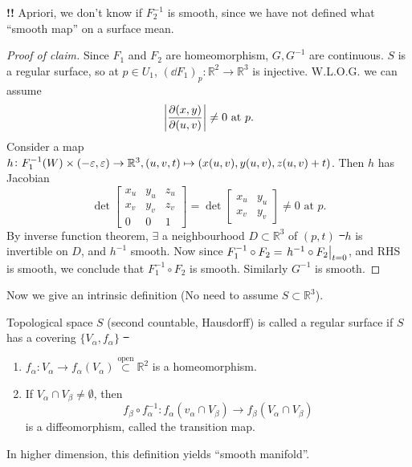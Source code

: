 \textbf{\color{red}!!} Apriori, we don't know if \(F_2^{-1}\) is smooth, since we
have not defined what ``smooth map'' on a surface mean.

\begin{proof}[Proof of claim]
    Since \(F_1\) and \(F_2\) are homeomorphism, \(G,G^{-1}\) are continuous.
    \(S\) is a regular surface, so at \(p\in U_1\), \((\dd{F_1})_p\colon\mathbb{R}^2
    \to \mathbb{R}^3\) is injective. W.L.O.G. we can assume \[
        \left|\pdv{(x,y)}{(u,v)}\right|\neq 0\text{ at }p
    .\] Consider a map \(h\colon F_1^{-1}(W)\times (-\varepsilon,\varepsilon)\to \mathbb{R}^3,
    (u,v,t)\mapsto (x(u,v),y(u,v),z(u,v)+t)\). Then \(h\) has Jacobian \[
        \det \begin{bmatrix}
            x_u & y_u & z_u \\
            x_v & y_v & z_v \\
            0 & 0 & 1
        \end{bmatrix}
        =\det\begin{bmatrix}
            x_u & y_u \\
            x_v & y_v 
        \end{bmatrix}\neq 0 \text{ at }p
    .\] By inverse function theorem, \(\exists\) a neighbourhood \(D\subset
    \mathbb{R}^3\) of \((p,t)\) \st\ \(h\) is invertible on \(D\), and \(h^{-1}\)
    smooth. Now since \(F_1^{-1}\circ F_2=\eval{h^{-1}\circ F_2}_{t=0}\), and RHS
    is smooth, we conclude that \(F_1^{-1}\circ F_2\) is smooth. Similarly \(G^{-1}\)
    is smooth.
\end{proof}

Now we give an intrinsic definition (No need to assume \(S\subset \mathbb{R}^3\)).
\begin{definition}
    Topological space \(S\) (second countable, Hausdorff) is called a regular surface
    if \(S\) has a covering \(\{V_\alpha,f_\alpha\}\) \st\ 
    \begin{enumerate}[(1)]
        \item \(f_\alpha\colon V_\alpha\to f_\alpha(V_\alpha)\overset{\text{open}}
            \subset \mathbb{R}^2\) is a homeomorphism.
        \item If \(V_\alpha\cap V_\beta\neq \emptyset\), then \[
            f_\beta\circ f_\alpha^{-1}\colon f_\alpha(v_\alpha\cap V_\beta)\to 
            f_\beta(V_\alpha\cap V_\beta)
        \] is a diffeomorphism, called the transition map.
    \end{enumerate}
\end{definition}
\begin{remark}
    In higher dimension, this definition yields ``smooth manifold''.
\end{remark}
